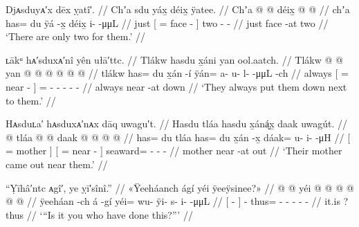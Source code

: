 \ex\label{ex:92-26-two-for-them}%
%
\begingl
	\glpreamble	Djᴀsduyᴀ′x dēx ỵatî′. //
	\glpreamble	Chʼa sdu yáx̱ déix̱ ÿatee. //
	\gla	Chʼa {}  @ {}  @ {} {}
		déix̱  @ {} @ {} //
	\glb	chʼa {} has= du ÿá -x̱ {}
		déix̱ i-  -μμL //
	\glc	just {}[ =  face - {}]
		two -  - //
	\gld	just {}  {} face -at {}
		two  {} {} //
	\glft	‘There are only two for them.’
		//
\endgl
\xe

\ex\label{ex:92-27-always-put-down-next}%
%
\begingl
	\glpreamble	ʟākᵘ hᴀ′sduxᴀ′nî yên ułā′ttc. //
	\glpreamble	Tlákw hasdu x̱áni yan ool.aatch. //
	\gla	Tlákw {}  @ {}  @ {} {}
		yan @  @ {} @ {} @ {} @ {} @ {} //
	\glb	tlákw {} has= du x̱án -í {}
		ÿán= a- u- l-  -μμL -ch //
	\glc	always {}[ =  near - {}]
		= - - -
			 - - //
	\gld	always {}  {} near -at {}
		down  {} {} {} {} {} //
	\glft	‘They always put them down next to them.’
		//
\endgl
\xe

\ex\label{ex:92-28-mom-came}%
%
\begingl
	\glpreamble	Hᴀsduʟa′ hᴀsduxᴀ′nᴀx dāq uwagu′t. //
	\glpreamble	Hasdu tláa hasdu x̱áná̬x̱ daak uwagút. //
	\gla	{}  @ {} tláa {}
		{}  @ {}  @ {} {}
		daak @  @ {} @ {} @ {} //
	\glb	{} has= du tláa {}
		{} has= du x̱án -x̱ {}
		dáak= u- i-  -μH //
	\glc	{}[ =  mother {}]
		{}[ =  near - {}]
		seaward= - -  - //
	\gld	{}  {} mother {}
		{}  {} near -at {}
		out  {} {} {} //
	\glft	‘Their mother came out near them.’
		//
\endgl
\xe

\ex\label{ex:92-29-you-did-this}%
%
\begingl
	\glpreamble	“Ỵīhâ′ntc ᴀgî′, ye ỵī′sînî.” //
	\glpreamble	«\!Ÿeeháanch ágí yéi ÿeeÿsinee?\!» //
	\gla	{}  @ {} {}  @ {}
		yéi @  @ {} @ {} @ {} @ {} @ {} //
	\glb	{} ÿeeháan -ch {} á -gí
		yéi= wu- ÿi- s- i-  -μμL //
	\glc	{}[  - {}]  -
		thus= - - - -  - //
	\gld	{}  {} {} it.is \·?
		thus  {} {} {} {} {} //
	\glft	‘“Is it you who have done this?”’
		//
\endgl
\xe

